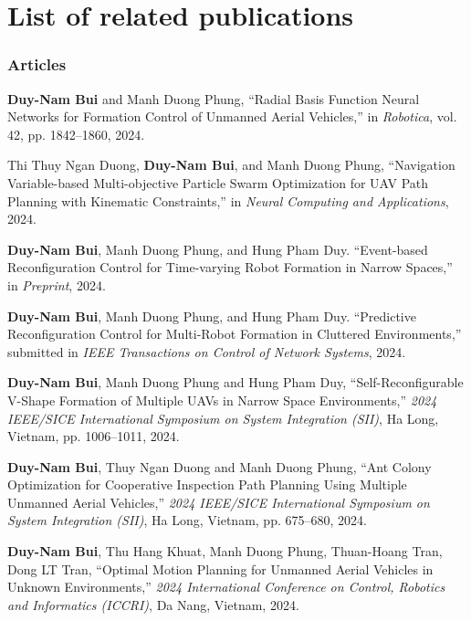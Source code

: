 \chapter*{List of related publications}

\subsection*{Articles}
\textbf{Duy-Nam Bui} and Manh Duong Phung, ``Radial Basis Function Neural Networks for Formation Control of Unmanned Aerial Vehicles,'' in \textit{Robotica}, vol. 42, pp. {1842--1860}, 2024.

Thi Thuy Ngan Duong, \textbf{Duy-Nam Bui}, and Manh Duong Phung, ``Navigation Variable-based Multi-objective Particle Swarm Optimization for UAV Path Planning with Kinematic Constraints,'' in \textit{Neural Computing and Applications}, 2024.

\textbf{Duy-Nam Bui}, Manh Duong Phung, and Hung Pham Duy. ``Event-based Reconfiguration Control for Time-varying Robot Formation in Narrow Spaces,'' in \textit{Preprint}, 2024.

\textbf{Duy-Nam Bui}, Manh Duong Phung, and Hung Pham Duy. ``Predictive Reconfiguration Control for Multi-Robot Formation in Cluttered Environments,'' submitted in \textit{IEEE Transactions on Control of Network Systems}, 2024.

\textbf{Duy-Nam Bui}, Manh Duong Phung and Hung Pham Duy, ``Self-Reconfigurable V-Shape Formation of Multiple UAVs in Narrow Space Environments,'' \textit{2024 IEEE/SICE International Symposium on System Integration (SII)}, Ha Long, Vietnam, pp. 1006--1011, 2024.

\textbf{Duy-Nam Bui}, Thuy Ngan Duong and Manh Duong Phung, ``Ant Colony Optimization for Cooperative Inspection Path Planning Using Multiple Unmanned Aerial Vehicles,'' \textit{2024 IEEE/SICE International Symposium on System Integration (SII)}, Ha Long, Vietnam, pp. 675--680, 2024.

\textbf{Duy-Nam Bui}, Thu Hang Khuat, Manh Duong Phung, Thuan-Hoang Tran, Dong LT Tran, ``Optimal Motion Planning for Unmanned Aerial Vehicles in Unknown Environments,'' \textit{2024 International Conference on Control, Robotics and Informatics (ICCRI)}, Da Nang, Vietnam, 2024.


